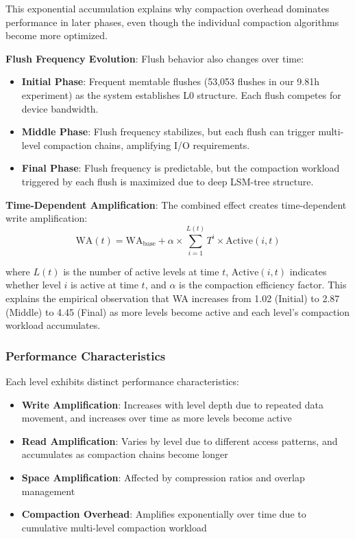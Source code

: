 \documentclass[11pt]{article}
\begin{document}
This exponential accumulation explains why compaction overhead dominates performance in later phases, even though the individual compaction algorithms become more optimized.

\textbf{Flush Frequency Evolution}: Flush behavior also changes over time:
\begin{itemize}
    \item \textbf{Initial Phase}: Frequent memtable flushes (53,053 flushes in our 9.81h experiment) as the system establishes L0 structure. Each flush competes for device bandwidth.
    \item \textbf{Middle Phase}: Flush frequency stabilizes, but each flush can trigger multi-level compaction chains, amplifying I/O requirements.
    \item \textbf{Final Phase}: Flush frequency is predictable, but the compaction workload triggered by each flush is maximized due to deep LSM-tree structure.
\end{itemize}

\textbf{Time-Dependent Amplification}: The combined effect creates time-dependent write amplification:
\begin{equation}
\text{WA}(t) = \text{WA}_{\text{base}} + \alpha \times \sum_{i=1}^{L(t)} T^i \times \text{Active}(i, t)
\end{equation}

where $L(t)$ is the number of active levels at time $t$, $\text{Active}(i, t)$ indicates whether level $i$ is active at time $t$, and $\alpha$ is the compaction efficiency factor. This explains the empirical observation that WA increases from 1.02 (Initial) to 2.87 (Middle) to 4.45 (Final) as more levels become active and each level's compaction workload accumulates.

\subsubsection{Performance Characteristics}
Each level exhibits distinct performance characteristics:
\begin{itemize}
    \item \textbf{Write Amplification}: Increases with level depth due to repeated data movement, and increases over time as more levels become active
    \item \textbf{Read Amplification}: Varies by level due to different access patterns, and accumulates as compaction chains become longer
    \item \textbf{Space Amplification}: Affected by compression ratios and overlap management
    \item \textbf{Compaction Overhead}: Amplifies exponentially over time due to cumulative multi-level compaction workload
\end{itemize}
\end{document}
